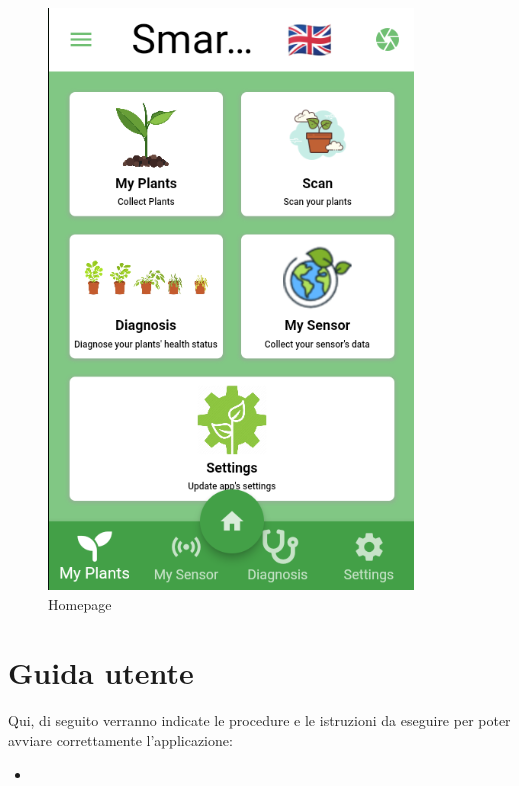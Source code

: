 \documentclass[a4paper,12pt]{report}
\begin{document}
\begin{figure}[ht] 
	\centering
	\includegraphics[width=.5\textwidth, height=.5\textheight, keepaspectratio]{./images/home/home_screen.png}
	\caption{Homepage}
	\label{fig:homepage}
\end{figure}
	
	
\newpage

\section{Guida utente}

\textsf{\small Qui, di seguito verranno indicate le procedure e le istruzioni da eseguire per poter avviare correttamente l'applicazione: } \\

\begin{itemize}
	\item \textsf{\small }
\end{itemize}

\end{document}
